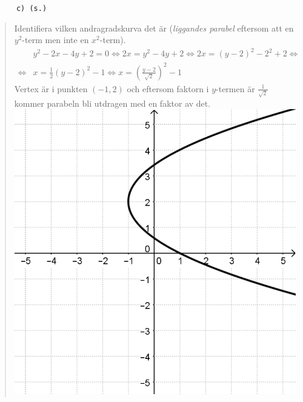 \documentclass[a4paper]{article}
\newcommand{\tskcol}[1]{\textcolor{tskcol}{#1}}
\begin{document}
	\pagebreak
	\texttt{\tskcol{~~~~~~c) (s.)}}
	\begin{quotation}
		\noindent
		Identifiera vilken andragradskurva det är (\emph{liggandes parabel} eftersom att en $y^2$-term men inte en $x^2$-term).
		\begin{align*}
		&y^2-2x-4y+2=0 \Leftrightarrow
		2x=y^2-4y+2 \Leftrightarrow
		2x=(y-2)^2-2^2+2 \Leftrightarrow \\ \Leftrightarrow
		&x=\frac{1}{2}(y-2)^2-1 \Leftrightarrow
		x=\left(\frac{y-2}{\sqrt{2}}\right)^2-1
		\end{align*}
		Vertex är i punkten $(-1,2)$ och eftersom faktorn i $y$-termen är $\frac{1}{\sqrt{2}}$ kommer parabeln bli utdragen med en faktor av det. \\
		\includegraphics[scale=0.2]{images/531c.png}
	\end{quotation}
	
\end{document}
